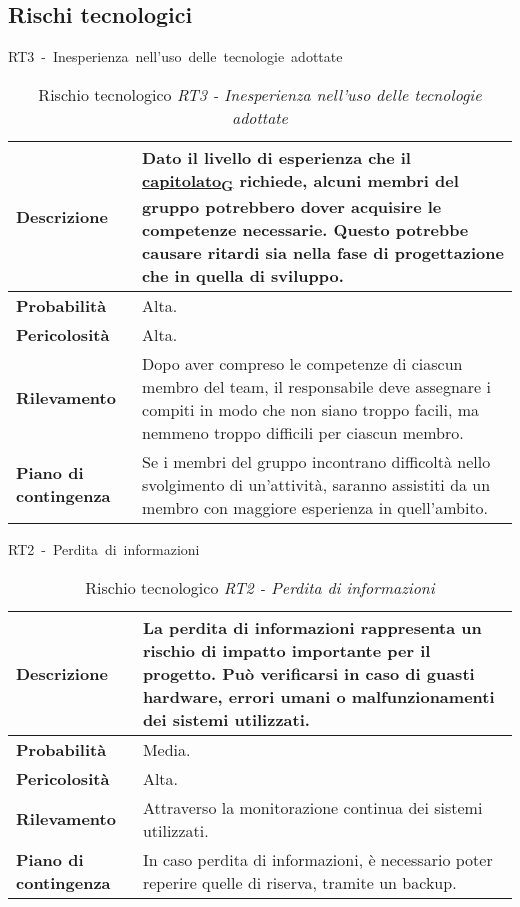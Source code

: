 

\begin{table}[!h]
    \subsection{Rischi tecnologici}
    \centering
    \hbox{RT3 - Inesperienza nell'uso delle tecnologie adottate}
    \vspace{0.3cm}
	\begin{tabular}{|l|p{10cm}|} 
		\hline
		\textbf{Descrizione} & Dato il livello di esperienza che il \href{https://7last.github.io/docs/rtb/documentazione-interna/glossario\#capitolato}{capitolato\textsubscript{G}} richiede,  alcuni membri del gruppo potrebbero dover acquisire le competenze necessarie. Questo potrebbe causare ritardi sia nella fase di progettazione che in quella di sviluppo.  \\

        \hline
        \textbf{Probabilità} & Alta. \\
        \hline
        \textbf{Pericolosità} & Alta. \\
        \hline
        \textbf{Rilevamento} & Dopo aver compreso le competenze di ciascun membro del team, il responsabile deve assegnare i compiti in modo che non siano troppo facili, ma nemmeno troppo difficili per ciascun membro. \\
        \hline
        \textbf{Piano di contingenza} & Se i membri del gruppo incontrano difficoltà nello svolgimento di un'attività, saranno assistiti da un membro con maggiore esperienza in quell'ambito. \\
		\hline
	\end{tabular}
    \caption{Rischio tecnologico \textit{RT3 - Inesperienza nell'uso delle tecnologie adottate}}
    \label{table:5}
\end{table}

\begin{table}[!h]
    \centering
    \hbox{RT2 - Perdita di informazioni}
    \vspace{0.3cm}
	\begin{tabular}{|l|p{10cm}|} 
		\hline
		\textbf{Descrizione} & La perdita di informazioni rappresenta un rischio di impatto importante per il progetto. Può verificarsi in caso di guasti hardware, errori umani o malfunzionamenti dei sistemi utilizzati. \\ 
        \hline
        \textbf{Probabilità} & Media. \\
        \hline
        \textbf{Pericolosità} & Alta. \\
        \hline
        \textbf{Rilevamento} & Attraverso la monitorazione continua dei sistemi utilizzati. \\
        \hline
        \textbf{Piano di contingenza} & In caso perdita di informazioni, è necessario poter reperire quelle di riserva, tramite un backup. \\
		\hline
	\end{tabular}
    \caption{Rischio tecnologico \textit{RT2 - Perdita di informazioni}}
    \label{table:6}
\end{table}


